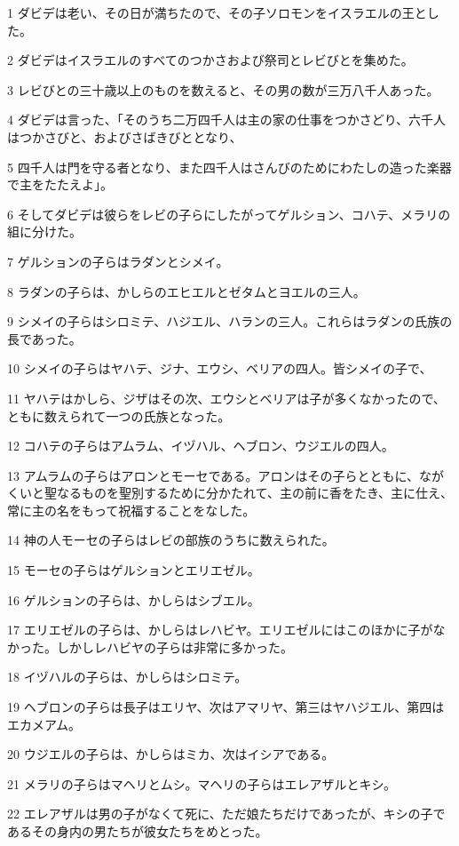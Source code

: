 \par 1 ダビデは老い、その日が満ちたので、その子ソロモンをイスラエルの王とした。
\par 2 ダビデはイスラエルのすべてのつかさおよび祭司とレビびとを集めた。
\par 3 レビびとの三十歳以上のものを数えると、その男の数が三万八千人あった。
\par 4 ダビデは言った、「そのうち二万四千人は主の家の仕事をつかさどり、六千人はつかさびと、およびさばきびととなり、
\par 5 四千人は門を守る者となり、また四千人はさんびのためにわたしの造った楽器で主をたたえよ」。
\par 6 そしてダビデは彼らをレビの子らにしたがってゲルション、コハテ、メラリの組に分けた。
\par 7 ゲルションの子らはラダンとシメイ。
\par 8 ラダンの子らは、かしらのエヒエルとゼタムとヨエルの三人。
\par 9 シメイの子らはシロミテ、ハジエル、ハランの三人。これらはラダンの氏族の長であった。
\par 10 シメイの子らはヤハテ、ジナ、エウシ、ベリアの四人。皆シメイの子で、
\par 11 ヤハテはかしら、ジザはその次、エウシとベリアは子が多くなかったので、ともに数えられて一つの氏族となった。
\par 12 コハテの子らはアムラム、イヅハル、ヘブロン、ウジエルの四人。
\par 13 アムラムの子らはアロンとモーセである。アロンはその子らとともに、ながくいと聖なるものを聖別するために分かたれて、主の前に香をたき、主に仕え、常に主の名をもって祝福することをなした。
\par 14 神の人モーセの子らはレビの部族のうちに数えられた。
\par 15 モーセの子らはゲルションとエリエゼル。
\par 16 ゲルションの子らは、かしらはシブエル。
\par 17 エリエゼルの子らは、かしらはレハビヤ。エリエゼルにはこのほかに子がなかった。しかしレハビヤの子らは非常に多かった。
\par 18 イヅハルの子らは、かしらはシロミテ。
\par 19 ヘブロンの子らは長子はエリヤ、次はアマリヤ、第三はヤハジエル、第四はエカメアム。
\par 20 ウジエルの子らは、かしらはミカ、次はイシアである。
\par 21 メラリの子らはマヘリとムシ。マヘリの子らはエレアザルとキシ。
\par 22 エレアザルは男の子がなくて死に、ただ娘たちだけであったが、キシの子であるその身内の男たちが彼女たちをめとった。
